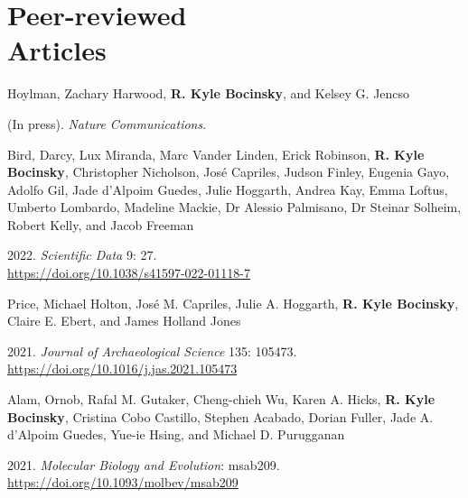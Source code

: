 \section{Peer-reviewed \\ Articles}

Hoylman, Zachary Harwood, {\bf R. Kyle Bocinsky}, and Kelsey G. Jencso
\begin{list1}
\item[] (In press)\hspace{.2cm}{Drought assessment has been outpaced by climate change: Empirical arguments for a paradigm shift}. \emph{Nature Communications}.
\end{list1}


Bird, Darcy, Lux Miranda, Marc Vander Linden, Erick Robinson, {\bf R. Kyle Bocinsky}, Christopher Nicholson, José Capriles, Judson Finley, Eugenia Gayo, Adolfo Gil, Jade d'Alpoim Guedes, Julie Hoggarth, Andrea Kay, Emma Loftus, Umberto Lombardo, Madeline Mackie, Dr Alessio Palmisano, Dr Steinar Solheim, Robert Kelly, and Jacob Freeman
\begin{list1}
\item[] 2022\hspace{.2cm}{p3k14c, a synthetic global database of archaeological radiocarbon dates}. \emph{Scientific Data} 9: 27. \\\href{https://doi.org/10.1038/s41597-022-01118-7}{https://doi.org/10.1038/s41597-022-01118-7}
\end{list1}


Price, Michael Holton, José M. Capriles, Julie A. Hoggarth, {\bf R. Kyle Bocinsky}, Claire E. Ebert, and James Holland Jones
\begin{list1}
\item[] 2021\hspace{.2cm}{End-to-end Bayesian analysis for summarizing sets of radiocarbon dates}. \emph{Journal of Archaeological Science} 135: 105473. \\\href{https://doi.org/10.1016/j.jas.2021.105473}{https://doi.org/10.1016/j.jas.2021.105473}
\end{list1}


Alam, Ornob, Rafal M. Gutaker, Cheng-chieh Wu, Karen A. Hicks, {\bf R. Kyle Bocinsky}, Cristina Cobo Castillo, Stephen Acabado, Dorian Fuller, Jade A. d’Alpoim Guedes, Yue-ie Hsing, and Michael D. Purugganan
\begin{list1}
\item[] 2021\hspace{.2cm}{Genome analysis traces regional dispersal of rice in Taiwan and Southeast Asia}. \emph{Molecular Biology and Evolution}: msab209.\\\href{https://doi.org/10.1093/molbev/msab209}{https://doi.org/10.1093/molbev/msab209}
\end{list1}


